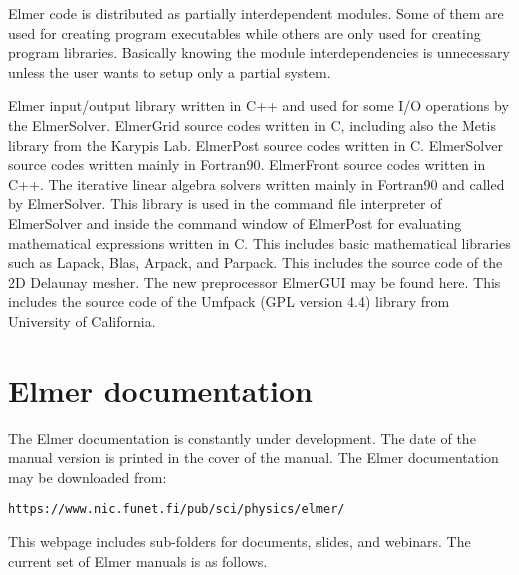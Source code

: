Elmer code is distributed as partially interdependent modules. Some of them are used for creating
program executables while others are only used for creating program libraries. 
Basically knowing the module interdependencies is unnecessary unless the user wants to 
setup only a partial system.

\sifbegin
{}
Elmer input/output library written in C++ and used for some I/O operations by the ElmerSolver. 
ElmerGrid source codes written in C, including also the Metis library from the Karypis Lab. 
ElmerPost source codes written in C. 
ElmerSolver source codes written mainly in Fortran90.
ElmerFront source codes written in C++.
The iterative linear algebra solvers written mainly in Fortran90 and called by ElmerSolver.
This library is used in the command file interpreter of ElmerSolver and inside the command 
window of ElmerPost for evaluating mathematical expressions written in C.  
This includes basic mathematical libraries such as Lapack, Blas, Arpack, and Parpack.
This includes the source code of the 2D Delaunay mesher. 
The new preprocessor ElmerGUI may be found here.
This includes the source code of the Umfpack (GPL version 4.4) library from University of California.
\sifend


\section{Elmer documentation}

The Elmer documentation is constantly under development. The date of the manual version is 
printed in the cover of the manual.  The Elmer documentation may be downloaded from:

\begin{verbatim}
https://www.nic.funet.fi/pub/sci/physics/elmer/
\end{verbatim}

This webpage includes sub-folders for documents, slides, and webinars.  The current set of Elmer manuals is as follows.

